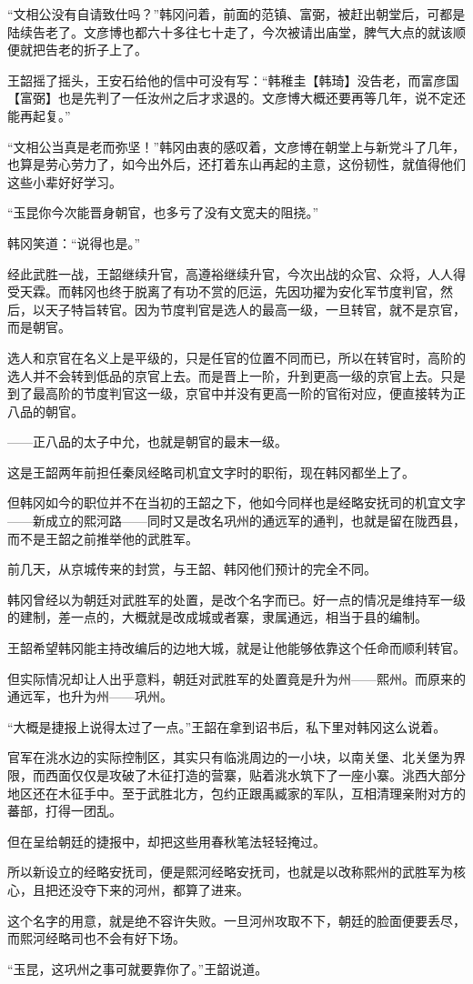 “文相公没有自请致仕吗？”韩冈问着，前面的范镇、富弼，被赶出朝堂后，可都是陆续告老了。文彦博也都六十多往七十走了，今次被请出庙堂，脾气大点的就该顺便就把告老的折子上了。

王韶摇了摇头，王安石给他的信中可没有写：“韩稚圭【韩琦】没告老，而富彦国【富弼】也是先判了一任汝州之后才求退的。文彦博大概还要再等几年，说不定还能再起复。”

“文相公当真是老而弥坚！”韩冈由衷的感叹着，文彦博在朝堂上与新党斗了几年，也算是劳心劳力了，如今出外后，还打着东山再起的主意，这份韧性，就值得他们这些小辈好好学习。

“玉昆你今次能晋身朝官，也多亏了没有文宽夫的阻挠。”

韩冈笑道：“说得也是。”

经此武胜一战，王韶继续升官，高遵裕继续升官，今次出战的众官、众将，人人得受天霖。而韩冈也终于脱离了有功不赏的厄运，先因功擢为安化军节度判官，然后，以天子特旨转官。因为节度判官是选人的最高一级，一旦转官，就不是京官，而是朝官。

选人和京官在名义上是平级的，只是任官的位置不同而已，所以在转官时，高阶的选人并不会转到低品的京官上去。而是晋上一阶，升到更高一级的京官上去。只是到了最高阶的节度判官这一级，京官中并没有更高一阶的官衔对应，便直接转为正八品的朝官。

——正八品的太子中允，也就是朝官的最末一级。

这是王韶两年前担任秦凤经略司机宜文字时的职衔，现在韩冈都坐上了。

但韩冈如今的职位并不在当初的王韶之下，他如今同样也是经略安抚司的机宜文字——新成立的熙河路——同时又是改名巩州的通远军的通判，也就是留在陇西县，而不是王韶之前推举他的武胜军。

前几天，从京城传来的封赏，与王韶、韩冈他们预计的完全不同。

韩冈曾经以为朝廷对武胜军的处置，是改个名字而已。好一点的情况是维持军一级的建制，差一点的，大概就是改成城或者寨，隶属通远，相当于县的编制。

王韶希望韩冈能主持改编后的边地大城，就是让他能够依靠这个任命而顺利转官。

但实际情况却让人出乎意料，朝廷对武胜军的处置竟是升为州——熙州。而原来的通远军，也升为州——巩州。

“大概是捷报上说得太过了一点。”王韶在拿到诏书后，私下里对韩冈这么说着。

官军在洮水边的实际控制区，其实只有临洮周边的一小块，以南关堡、北关堡为界限，而西面仅仅是攻破了木征打造的营寨，贴着洮水筑下了一座小寨。洮西大部分地区还在木征手中。至于武胜北方，包约正跟禹臧家的军队，互相清理亲附对方的蕃部，打得一团乱。

但在呈给朝廷的捷报中，却把这些用春秋笔法轻轻掩过。

所以新设立的经略安抚司，便是熙河经略安抚司，也就是以改称熙州的武胜军为核心，且把还没夺下来的河州，都算了进来。

这个名字的用意，就是绝不容许失败。一旦河州攻取不下，朝廷的脸面便要丢尽，而熙河经略司也不会有好下场。

“玉昆，这巩州之事可就要靠你了。”王韶说道。


